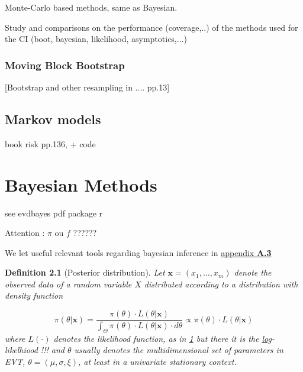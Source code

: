 \documentclass[11pt,a4paper,openany ]{book}
\newtheorem{definition}{Definition}[chapter]
\begin{document}
Monte-Carlo based methods, same as Bayesian.

Study and comparisons on the performance (coverage,..) of the methods used for the CI (boot, bayesian, likelihood, asymptotics,...)
\subsection{Moving Block Bootstrap}

[Bootstrap and other resampling in .... pp.13]


\section{Markov models}
book risk pp.136, \cite{shaby_markov-switching_2016} + code





\chapter{Bayesian Methods}\label{sec::bayesian}
\vspace{-1cm}
\minitoc\thispagestyle{empty}

see evdbayes pdf package r

Attention : $\pi$ ou $f$ ?????? 

We let useful relevant tools regarding bayesian inference in \hyperref[bayesapp]{appendix 
	\textbf{A.3}}


\begin{definition}[Posterior distribution]
	Let $\boldsymbol{x}=(x_1,\dots,x_m)$
	denote the observed data of a random variable $X$ distributed according to a distribution with density function 
	
	
	\begin{equation}\label{bayeseq}
	\pi (\theta|\boldsymbol{x})=\frac{\pi(\theta)\cdot L(\theta|\boldsymbol{x})}{\int_{\Theta} 
		\pi(\theta)\cdot L(\theta|\boldsymbol{x}) \cdot d\theta}\propto \pi(\theta)\cdot 
	L(\theta|\boldsymbol{x})
	\end{equation}
	where $L(\cdot)$ denotes the likelihood function, as in \ref{} but there it is the \underline{log}-likelhiood !!!
	and $\theta$ usually denotes the multidimensional set of parameters in EVT, $\theta=(\mu,\sigma,\xi)$, at least in a univariate stationary context.
\end{definition}
\end{document}
